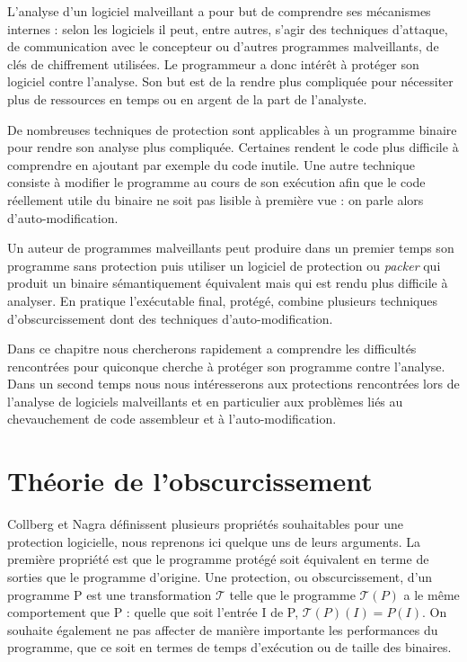 L'analyse d'un logiciel malveillant a pour but de comprendre ses mécanismes internes : selon les logiciels il peut, entre autres, s'agir des techniques d'attaque, de communication avec le concepteur ou d'autres programmes malveillants, de clés de chiffrement utilisées. Le programmeur a donc intérêt à protéger son logiciel contre l'analyse. Son but est de la rendre plus compliquée pour nécessiter plus de ressources en temps ou en argent de la part de l'analyste.

De nombreuses techniques de protection sont applicables à un programme binaire pour rendre son analyse plus compliquée. Certaines rendent le code plus difficile à comprendre en ajoutant par exemple du code inutile. Une autre technique consiste à modifier le programme au cours de son exécution afin que le code réellement utile du binaire ne soit pas lisible à première vue : on parle alors d'auto-modification.

Un auteur de programmes malveillants peut produire dans un premier temps son programme sans protection puis utiliser un logiciel de protection ou \emph{packer} qui produit un binaire sémantiquement équivalent mais qui est rendu plus difficile à analyser. En pratique l'exécutable final, protégé, combine plusieurs techniques d'obscurcissement dont des techniques d'auto-modification.

Dans ce chapitre nous chercherons rapidement a comprendre les difficultés rencontrées pour quiconque cherche à protéger son programme contre l'analyse. Dans un second temps nous nous intéresserons aux protections rencontrées lors de l'analyse de logiciels malveillants et en particulier aux problèmes liés au chevauchement de code assembleur et à l'auto-modification.



\section{Théorie de l'obscurcissement}

Collberg et Nagra \cite{nagra2009surreptitious} définissent plusieurs propriétés souhaitables pour une protection logicielle, nous reprenons ici quelque uns de leurs arguments. La première propriété est que le programme protégé soit équivalent en terme de sorties que le programme d'origine.
Une protection, ou obscurcissement, d'un programme P est une transformation $\mathcal{T}$ telle que le programme $\mathcal{T}(P)$ a le même comportement que P : quelle que soit l'entrée I de P, $\mathcal{T}(P)(I)=P(I)$.
On souhaite également ne pas affecter de manière importante les performances du programme, que ce soit en termes de temps d'exécution ou de taille des binaires.

